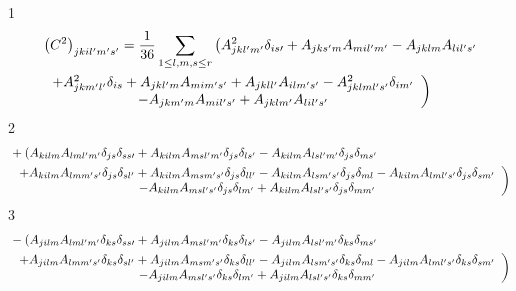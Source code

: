 \documentclass[aps,preprint]{revtex4}%
\begin{document}
1%
\begin{align}
&  \left(  C^{2}\right)  _{jkil^{\prime}m^{\prime}s^{\prime}}=\frac{1}{36}%
\sum_{1\leq l,m,s\leq r}\left(  A_{jkl^{\prime}m^{\prime}}^{2}\delta
_{is\prime}+A_{jks^{\prime}m}A_{mil^{\prime}m^{\prime}}-A_{jklm}%
A_{lil^{\prime}s^{\prime}}\right. \\
&  \left.
\begin{array}
[c]{c}%
+A_{jkm^{\prime}l^{\prime}}^{2}\delta_{is}+A_{jkl^{\prime}m}A_{mim^{\prime
}s^{\prime}}+A_{jkll^{\prime}}A_{ilm^{\prime}s^{\prime}}-A_{jklml^{\prime
}s^{\prime}}^{2}\delta_{im^{\prime}}\\
-A_{jkm^{\prime}m}A_{mil^{\prime}s^{\prime}}+A_{jklm^{\prime}}A_{lil^{\prime
}s^{\prime}}%
\end{array}
\right)
\end{align}
2%
\begin{align}
&  +\left(  A_{kilm}A_{lml^{\prime}m^{\prime}}\delta_{js}\delta_{ss\prime
}+A_{kilm}A_{msl^{\prime}m^{\prime}}\delta_{js}\delta_{ls^{\prime}}%
-A_{kilm}A_{lsl^{\prime}m^{\prime}}\delta_{js}\delta_{ms^{\prime}}\right. \\
&  \left.
\begin{array}
[c]{c}%
+A_{kilm}A_{lmm^{\prime}s^{\prime}}\delta_{js}\delta_{sl^{\prime}}%
+A_{kilm}A_{msm^{\prime}s^{\prime}}\delta_{js}\delta_{ll^{\prime}}%
-A_{kilm}A_{lsm^{\prime}s^{\prime}}\delta_{js}\delta_{ml}-A_{kilm}%
A_{lml^{\prime}s^{\prime}}\delta_{js}\delta_{sm^{\prime}}\\
-A_{kilm}A_{msl^{\prime}s^{\prime}}\delta_{js}\delta_{lm^{\prime}}%
+A_{kilm}A_{lsl^{\prime}s^{\prime}}\delta_{js}\delta_{mm^{\prime}}%
\end{array}
\right)
\end{align}
3%
\begin{align}
&  -\left(  A_{jilm}A_{lml^{\prime}m^{\prime}}\delta_{ks}\delta_{ss\prime
}+A_{jilm}A_{msl^{\prime}m^{\prime}}\delta_{ks}\delta_{ls^{\prime}}%
-A_{jilm}A_{lsl^{\prime}m^{\prime}}\delta_{ks}\delta_{ms^{\prime}}\right. \\
&  \left.
\begin{array}
[c]{c}%
+A_{jilm}A_{lmm^{\prime}s^{\prime}}\delta_{ks}\delta_{sl^{\prime}}%
+A_{jilm}A_{msm^{\prime}s^{\prime}}\delta_{ks}\delta_{ll^{\prime}}%
-A_{jilm}A_{lsm^{\prime}s^{\prime}}\delta_{ks}\delta_{ml}-A_{jilm}%
A_{lml^{\prime}s^{\prime}}\delta_{ks}\delta_{sm^{\prime}}\\
-A_{jilm}A_{msl^{\prime}s^{\prime}}\delta_{ks}\delta_{lm^{\prime}}%
+A_{jilm}A_{lsl^{\prime}s^{\prime}}\delta_{ks}\delta_{mm^{\prime}}%
\end{array}
\right)
\end{align}
\end{document}
